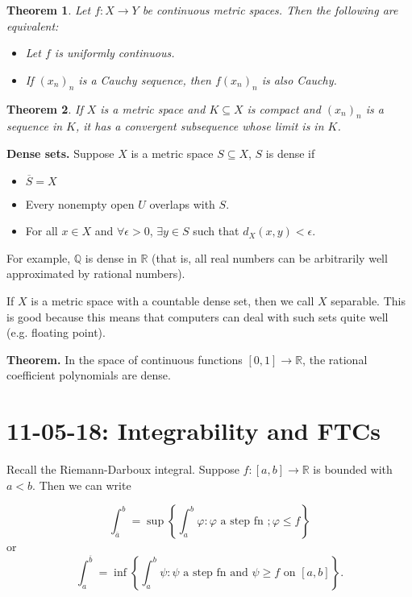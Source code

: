 \documentclass[12pt]{article}
\newtheorem*{theorem}{Theorem}
\newcommand{\RR}{\mathbb{R}}
\newcommand{\R}{\mathbb{R}}
\newcommand{\QQ}{\mathbb{Q}}
\newcommand{\eps}{\epsilon}
\newcommand{\ol}{\overline}
\begin{document}
\begin{theorem}
  Let $f: X \to Y$ be continuous metric spaces.  Then the following are equivalent:

  \begin{itemize}
    \item Let $f$ is uniformly continuous.
    \item If $(x_n)_n$ is a Cauchy sequence, then $f(x_n)_n$ is also Cauchy.
  \end{itemize}
\end{theorem}

\begin{theorem}
  If $X$ is a metric space and $K \subseteq X$ is compact and $(x_n)_n$ is a sequence in $K$, it has a convergent subsequence whose limit is in $K$.
\end{theorem}

{\bf Dense sets.} Suppose $X$ is a metric space $S \subseteq X$, $S$ is dense if 

\begin{itemize}
  \item $\ol{S} = X$
  \item Every nonempty open $U$ overlaps with $S$. 
  \item For all $x \in X$ and $\forall \eps > 0$, $\exists y \in S$ such that $d_{X}(x, y) < \eps$.
\end{itemize}

For example, $\QQ$ is dense in $\RR$ (that is, all real numbers can be arbitrarily well approximated by rational numbers).

If $X$ is a metric space with a countable dense set, then we call $X$ separable.  This is good because this means that computers can deal with such sets quite well (e.g. floating point).

{\bf Theorem.} In the space of continuous functions $[0, 1] \to \RR$, the rational coefficient polynomials are dense.


\section{11-05-18: Integrability and FTCs}

Recall the Riemann-Darboux integral.  Suppose $f:[a, b] \to \R$ is bounded with $a < b$.  Then we can write

\[
  \int_{\ol{a}}^{b} = \sup \left\{  \int_{a}^{b} \varphi: \varphi \text{ a step fn }; \varphi \leq f \right\}
\]
or
\[
  \int_{a}^{\ol{b}} = \inf \left\{ \int_{a}^{b} \psi: \psi \text{ a step fn and } \psi \geq f \text{ on } [a, b] \right\}.
\]
\end{document}
